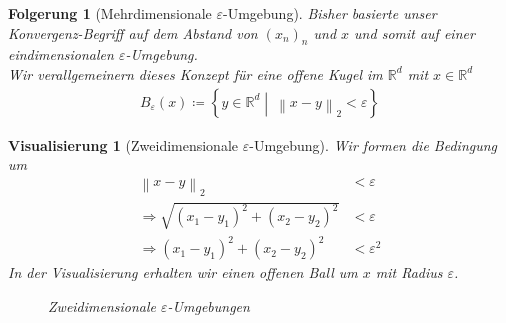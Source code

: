 \documentclass[11pt, twoside, a4paper]{article}
\theoremstyle{plain}
\newtheorem{folgerung}[blockelement]{Folgerung}
\newtheorem{visualisierung}[blockelement]{Visualisierung}
\newcommand{\set}[1]{\left\{#1\right\}}
\newcommand{\pair}[1]{\left(#1\right)}
\newcommand{\norm}[1]{\left\lVert#1\right\rVert}
\newcommand{\impl}[0]{\Rightarrow{}}
\newcommand{\definedas}[0]{\coloneqq}
\newcommand{\rgbcolor}[3]{rgb,255:red,#1;green,#2;blue,#3}
\newcommand{\R}{\mathbb{R}}
\begin{document}
    \begin{folgerung}[Mehrdimensionale $\varepsilon$-Umgebung]
        Bisher basierte unser Konvergenz-Begriff auf dem Abstand von $(x_n)_n$ und $x$ und somit auf einer eindimensionalen $\varepsilon$-Umgebung.\\
        Wir verallgemeinern dieses Konzept für eine offene Kugel im $\R^d$ mit $x\in\R^d$
        \begin{align*}
            B_\varepsilon(x) \definedas \set{y\in\R^d\middle |~ \norm{x-y}_2 < \varepsilon}
        \end{align*}
    \end{folgerung}

    \begin{visualisierung}[Zweidimensionale $\varepsilon$-Umgebung]
        Wir formen die Bedingung um
        \begin{align*}
            \norm{x-y}_2 &< \varepsilon\\
            \impl \sqrt{(x_1-y_1)^2 + (x_2 - y_2)^2} &< \varepsilon\\
            \impl \pair{x_1-y_1}^2 + \pair{x_2-y_2}^2 &< \varepsilon^2
        \end{align*}
        In der Visualisierung erhalten wir einen offenen Ball um $x$ mit Radius $\varepsilon$.

        \begin{figure}[H]
            \centering
            \caption{Zweidimensionale $\varepsilon$-Umgebungen}
        \end{figure}
    \end{visualisierung}
\end{document}
